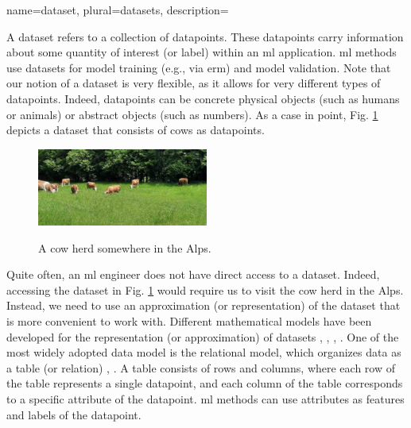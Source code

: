 {name={dataset}, plural={datasets},
	description={A dataset refers to a collection of \glspl{datapoint}. These 
		\glspl{datapoint} carry information about some quantity of interest (or \gls{label}) within 
		an \gls{ml} application. \gls{ml} methods use datasets for \gls{model} training (e.g., via \gls{erm})
		and \gls{model} \gls{validation}. Note that our notion of a dataset is very flexible, as 
		it allows for very different types of \glspl{datapoint}. Indeed, \glspl{datapoint} can be concrete 
		physical objects (such as humans or animals) or abstract objects (such as numbers). 
		As a case in point, Fig. \ref{fig_cows_dataset_dict} depicts a dataset that consists of cows as 
		\glspl{datapoint}. 
		\begin{figure}[H]
			\begin{center}
			\label{fig:cowsintheswissalps_dict}
			\includegraphics[width=0.5\textwidth]{assets/CowsAustria.jpg}
		  	\end{center}
			\caption{\label{fig_cows_dataset_dict}A cow herd somewhere in the Alps.}
	 	\end{figure}
       		Quite often, an \gls{ml} engineer does not have direct access to a dataset. Indeed, accessing the 
       		dataset in Fig. \ref{fig_cows_dataset_dict} would require us to visit the cow herd in the Alps. Instead, 
       		we need to use an approximation (or representation) of the dataset that is more convenient 
       		to work with. Different mathematical \glspl{model} have been developed for the representation (or approximation) 
       		of datasets \cite{silberschatz2019database}, \cite{abiteboul1995foundations}, \cite{hoberman2009data}, \cite{ramakrishnan2002database}. 
       		One of the most widely adopted data \gls{model} is the relational \gls{model}, which organizes \gls{data} 
       		as a table (or relation) \cite{codd1970relational}, \cite{silberschatz2019database}.
		A table consists of rows and columns, where each row of the table represents a single \gls{datapoint}, and 
		each column of the table corresponds to a specific attribute of the \gls{datapoint}. 
		\gls{ml} methods can use attributes as \glspl{feature} and \glspl{label} of the \gls{datapoint}.\\
}}

